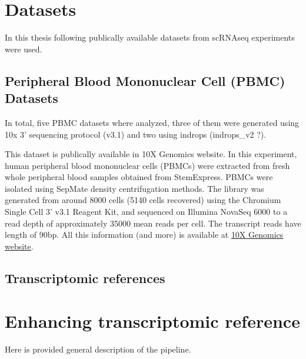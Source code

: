 \section{Datasets}

In this thesis following publically available datasets from scRNAseq experiments were used.

\subsection{Peripheral Blood Mononuclear Cell (PBMC) Datasets}

In total, five PBMC datasets where analyzed,
three of them were generated using 10x 3' sequencing protocol (v3.1) and two using indrops (indrops\_v2 ?).



This dataset is publically available in 10X Genomics website.
In this experiment, human peripheral blood mononuclear cells (PBMCs) were extracted from fresh whole peripheral blood samples obtained from StemExpress. PBMCs were isolated using SepMate density centrifugation methods.
The library was generated from around 8000 cells (5140 cells recovered) using the Chromium Single Cell 3' v3.1 Reagent Kit,
and sequenced on Illumina NovaSeq 6000 to a read depth of approximately 35000 mean reads per cell.
The transcript reads have length of 90bp.
All this information (and more) is available at
\href{https://www.10xgenomics.com/datasets/5k-human-pbmcs-3-v3-1-chromium-controller-3-1-standard}{10X Genomics website}.

\subsection{Transcriptomic references}

\section{Enhancing transcriptomic reference}

Here is provided general description of the pipeline.

